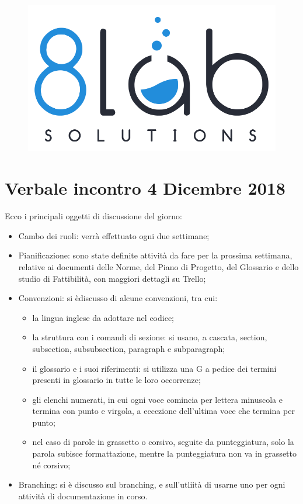 \documentclass[a4paper]{article}
\begin{document}
\begin{figure}
\centering
\includegraphics[scale=0.07]{Verbali/res/images/logo8_crop.png}
\end{figure}

\section*{Verbale incontro 4 Dicembre 2018}
Ecco i principali oggetti di discussione del giorno:
\begin{itemize}
	\item Cambo dei ruoli: verrà effettuato ogni due settimane;
	
	\item Pianificazione: sono state definite attività da fare per la prossima settimana, relative ai documenti delle Norme, del Piano di Progetto, del Glossario e dello studio di Fattibilità, con maggiori dettagli su Trello;

	\item Convenzioni: si èdiscusso di alcune convenzioni, tra cui:
	\begin{itemize}
		\item la lingua inglese da adottare nel codice;
		\item la struttura con i comandi di sezione: si usano, a cascata, section, subsection, subsubsection, paragraph e subparagraph;
		\item il glossario e i suoi riferimenti: si utilizza una G a pedice dei termini presenti in glossario in tutte le loro occorrenze;
		\item gli elenchi numerati, in cui ogni voce comincia per lettera minuscola e termina con punto e virgola, a eccezione dell'ultima voce che termina per punto;
		\item nel caso di parole in grassetto o corsivo, seguite da punteggiatura, solo la parola subisce formattazione, mentre la punteggiatura non va in grassetto né corsivo;
	\end{itemize}
	\item Branching: si è discusso sul branching, e sull'utliità di usarne uno per ogni attività  di documentazione in corso.
\end{itemize}
\end{document}
